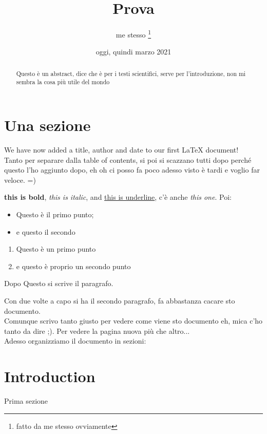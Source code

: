 \documentclass[12pt, letterpaper, twoside]{article}  %
\title{Prova}
\author{me stesso \thanks{fatto da me stesso ovviamente}}
\date{oggi, quindi marzo 2021}
\begin{document}

\maketitle  %

\tableofcontents  %


\section{Una sezione}
We have now added a title, author and date to our first \LaTeX{} document!
\\Tanto per separare dalla table of contents, si poi si scazzano tutti dopo perché questo l'ho aggiunto dopo, eh oh ci posso fa poco adesso visto è tardi e voglio far veloce. =)

\textbf{this is bold}, \textit{this is italic}, and \underline{this is underline}, c'è anche \emph{this one}. Poi:
\begin{itemize}
  \item Questo è il primo punto;
  \item e questo il secondo
\end{itemize}

\begin{enumerate}
  \item Questo è un primo punto
  \item e questo è proprio un secondo punto
\end{enumerate}

\newpage\begin{abstract}
Questo è un abstract, dice che è per i testi scientifici, serve per l'introduzione, non mi sembra la cosa più utile del mondo
\end{abstract}

Dopo Questo si scrive il paragrafo.

Con due volte a capo si ha il secondo paragrafo, fa abbastanza cacare sto documento.
\\Comunque scrivo tanto giusto per vedere come viene sto documento eh, mica c'ho tanto da dire ;). Per vedere la pagina nuova più che altro...
\\Adesso organizziamo il documento in sezioni:  %

\newpage\section{Introduction}  %
Prima sezione
\end{document}
